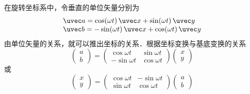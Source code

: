 在旋转坐标系中，令垂直的单位矢量分别为
\begin{equation}
\begin{array}{l}
\uvec a = \cos(\omega t)\,\uvec x + \sin (\omega t)\,\uvec y \\
\uvec b =  - \sin(\omega t)\,\uvec x + \cos(\omega t)\,\uvec y
\end{array}
\end{equation}
由单位矢量的关系，就可以推出坐标的关系．根据坐标变换与基底变换的关系 %
\begin{equation}\label{Corio_eq4}
\begin{pmatrix} a\\b \end{pmatrix} = 
\begin{pmatrix}
\cos\omega t & \sin\omega t\\
-\sin\omega t & \cos\omega t
\end{pmatrix}
\begin{pmatrix} x\\y \end{pmatrix}
\end{equation}
或
\begin{equation} \label{Corio_eq5}
\begin{pmatrix} x\\y \end{pmatrix} = 
\begin{pmatrix}
\cos\omega t & -\sin\omega t\\
\sin\omega t & \cos\omega t
\end{pmatrix}
\begin{pmatrix} a\\b \end{pmatrix}
\end{equation}